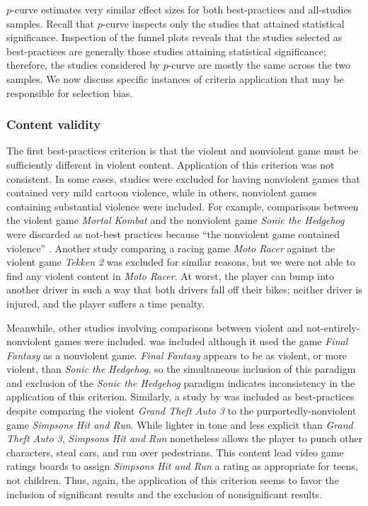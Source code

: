 \documentclass[man]{apa6}
\begin{document}
$p$-curve estimates very similar effect sizes for both best-practices and all-studies samples. Recall that $p$-curve inspects only the studies that attained statistical significance. Inspection of the funnel plots reveals that the studies selected as best-practices are generally those studies attaining statistical significance; therefore, the studies considered by $p$-curve are mostly the same across the two samples. We now discuss specific instances of criteria application that may be responsible for selection bias.

\subsubsection{Content validity}
The first best-practices criterion is that the violent and nonviolent game must be sufficiently different in violent content. Application of this criterion was not consistent. In some cases, studies were excluded for having nonviolent games that contained very mild cartoon violence, while in others, nonviolent games containing substantial violence were included. For example, comparisons between the violent game {\em Mortal Kombat} and the nonviolent game {\em Sonic the Hedgehog} were discarded as not-best practices \citep[e.g.,][]{Cohn:1995; Hoffman:1994} because ``the nonviolent game contained violence'' \citep[supplementary materials]{Anderson:etal:2010}. Another study comparing a racing game {\em Moto Racer} against the violent game {\em Tekken 2} \citep{Brooks:2000} was excluded for similar reasons, but we were not able to find any violent content in {\em Moto Racer}. At worst, the player can bump into another driver in such a way that both drivers fall off their bikes; neither driver is injured, and the player suffers a time penalty. 

Meanwhile, other studies involving comparisons between violent and not-entirely-nonviolent games were included. \citet{Konijn:etal:2007} was included although it used the game {\em Final Fantasy} as a nonviolent game. {\em Final Fantasy} appears to be as violent, or more violent, than {\em Sonic the Hedgehog}, so the simultaneous inclusion of this paradigm and exclusion of the {\em Sonic the Hedgehog} paradigm indicates inconsistency in the application of this criterion. Similarly, a study by \citet{Brady:Mathews:2006} was included as best-practices despite comparing the violent {\em Grand Theft Auto 3} to the purportedly-nonviolent game {\em Simpsons Hit and Run}. While lighter in tone and less explicit than {\em Grand Theft Auto 3}, {\em Simpsons Hit and Run} nonetheless allows the player to punch other characters, steal cars, and run over pedestrians. This content lead video game ratings boards to assign {\em Simpsons Hit and Run} a rating as appropriate for teens, not children. Thus, again, the application of this criterion seems to favor the inclusion of significant results and the exclusion of nonsignificant results.
\end{document}
